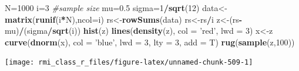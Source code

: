 \documentclass[]{book}
\newenvironment{Shaded}{\begin{snugshade}}{\end{snugshade}}
\newcommand{\CommentTok}[1]{\textcolor[rgb]{0.56,0.35,0.01}{\textit{#1}}}
\newcommand{\DataTypeTok}[1]{\textcolor[rgb]{0.13,0.29,0.53}{#1}}
\newcommand{\DecValTok}[1]{\textcolor[rgb]{0.00,0.00,0.81}{#1}}
\newcommand{\FloatTok}[1]{\textcolor[rgb]{0.00,0.00,0.81}{#1}}
\newcommand{\KeywordTok}[1]{\textcolor[rgb]{0.13,0.29,0.53}{\textbf{#1}}}
\newcommand{\NormalTok}[1]{#1}
\newcommand{\OperatorTok}[1]{\textcolor[rgb]{0.81,0.36,0.00}{\textbf{#1}}}
\newcommand{\StringTok}[1]{\textcolor[rgb]{0.31,0.60,0.02}{#1}}
\theoremstyle{definition}
\theoremstyle{definition}
\theoremstyle{definition}
\theoremstyle{remark}
\begin{document}
\begin{Shaded}
\begin{Highlighting}[]
\NormalTok{N=}\DecValTok{1000} 
\NormalTok{i=}\DecValTok{3} \CommentTok{#sample size}
\NormalTok{mu=}\FloatTok{0.5}
\NormalTok{sigma=}\DecValTok{1}\OperatorTok{/}\KeywordTok{sqrt}\NormalTok{(}\DecValTok{12}\NormalTok{)}
\NormalTok{data<-}\KeywordTok{matrix}\NormalTok{(}\KeywordTok{runif}\NormalTok{(i}\OperatorTok{*}\NormalTok{N),}\DataTypeTok{ncol=}\NormalTok{i)}
\NormalTok{rs<-}\KeywordTok{rowSums}\NormalTok{(data)}
\NormalTok{rs<-rs}\OperatorTok{/}\NormalTok{i}
\NormalTok{z<-(rs}\OperatorTok{-}\NormalTok{mu)}\OperatorTok{/}\NormalTok{(sigma}\OperatorTok{/}\KeywordTok{sqrt}\NormalTok{(i))}
\KeywordTok{hist}\NormalTok{(z)}
\KeywordTok{lines}\NormalTok{(}\KeywordTok{density}\NormalTok{(z), }\DataTypeTok{col =} \StringTok{'red'}\NormalTok{, }\DataTypeTok{lwd =} \DecValTok{3}\NormalTok{)}
\NormalTok{x<-z}
\KeywordTok{curve}\NormalTok{(}\KeywordTok{dnorm}\NormalTok{(x), }\DataTypeTok{col =} \StringTok{'blue'}\NormalTok{, }\DataTypeTok{lwd =} \DecValTok{3}\NormalTok{, }\DataTypeTok{lty =} \DecValTok{3}\NormalTok{, }\DataTypeTok{add =}\NormalTok{ T)}
\KeywordTok{rug}\NormalTok{(}\KeywordTok{sample}\NormalTok{(z,}\DecValTok{100}\NormalTok{))}
\end{Highlighting}
\end{Shaded}

\begin{center}\texttt{[image: rmi\_class\_r\_files/figure-latex/unnamed-chunk-509-1]} \end{center}
\end{document}
